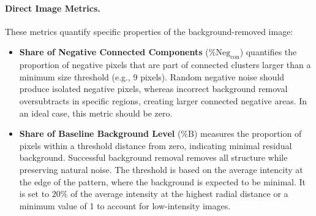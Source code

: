 \documentclass[iucr,review]{iucrjournals}
\begin{document}
\paragraph{Direct Image Metrics.} These metrics quantify specific properties of the background-removed image:
\begin{itemize}
        \item \textbf{Share of Negative Connected Components} ($\%\mathrm{Neg}_{\mathrm{con}}$) quantifies the proportion of negative pixels that are part of
        connected clusters larger than a minimum size threshold (e.g., 9 pixels). Random negative noise should produce
        isolated negative pixels,
        whereas incorrect background removal oversubtracts in specific regions,
        creating larger connected negative areas. In an ideal case,
        this metric should be zero.
        \item \textbf{Share of Baseline Background Level} ($\%\mathrm{B}$)
        measures the proportion of pixels within a threshold
        distance from zero,
        indicating minimal residual background.
        Successful background removal removes all structure while preserving natural noise.
        The threshold is based on the average intencity at the edge of the pattern, 
        where the background is expected to be minimal.
        It is set to $20\%$ of the average intensity at the highest radial distance
        or a minimum value of 1 to account for low-intensity images.




\end{itemize}
\end{document}
